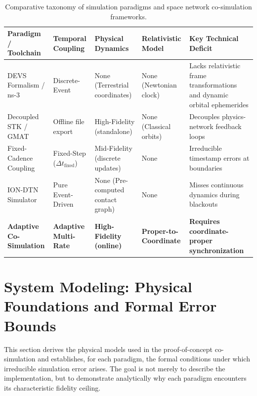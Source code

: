 \documentclass[a4paper,fleqn]{cas-sc}
\begin{document}
\begin{table}[htbp]
\centering
\caption{Comparative taxonomy of simulation paradigms and space network co-simulation frameworks.}
\label{tab:paradigm_survey}
\footnotesize
\begin{tabular}{p{2.8cm}p{2.6cm}p{2.6cm}p{2.4cm}p{3.8cm}}
\toprule
\textbf{Paradigm / Toolchain} & \textbf{Temporal Coupling} & \textbf{Physical Dynamics} & \textbf{Relativistic Model} & \textbf{Key Technical Deficit} \\
\midrule
DEVS Formalism / ns-3 & Discrete-Event & None (Terrestrial coordinates) & None (Newtonian clock) & Lacks relativistic frame transformations and dynamic orbital ephemerides \\
Decoupled STK / GMAT & Offline file export & High-Fidelity (standalone) & None (Classical orbits) & Decouples physics-network feedback loops \\
Fixed-Cadence Coupling & Fixed-Step ($\Delta t_{\text{fixed}}$) & Mid-Fidelity (discrete updates) & None & Irreducible timestamp errors at boundaries \\
ION-DTN Simulator & Pure Event-Driven & None (Pre-computed contact graph) & None & Misses continuous dynamics during blackouts \\
\textbf{Adaptive Co-Simulation} & \textbf{Adaptive Multi-Rate} & \textbf{High-Fidelity (online)} & \textbf{Proper-to-Coordinate} & \textbf{Requires coordinate-proper synchronization} \\
\bottomrule
\end{tabular}
\end{table}

\section{System Modeling: Physical Foundations and Formal Error Bounds}
\label{sec:modeling}

This section derives the physical models used in the proof-of-concept co-simulation and establishes, for each paradigm, the formal conditions under which irreducible simulation error arises. The goal is not merely to describe the implementation, but to demonstrate analytically why each paradigm encounters its characteristic fidelity ceiling.
\end{document}
